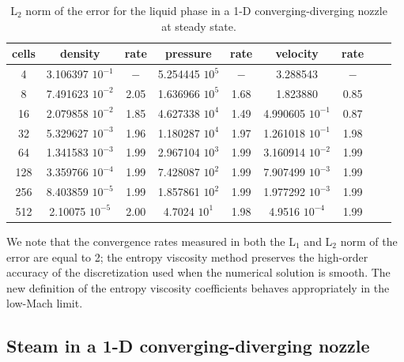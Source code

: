 \documentclass[review,10pt]{elsarticle}
\newcommand{\tcr}[1]{\textcolor{red}{#1}}
\newcommand{\tcb}[1]{\textcolor{blue}{#1}}
\begin{document}
%
%
\begin{table}[H]
\begin{center}
 \caption{\label{tbl:l2_norm_liq} L$_2$ norm of the error for the liquid phase in a 1-D converging-diverging nozzle at steady state.}
 \begin{tabular}{|c|c|c|c|c|c|c|c|c|}
 \hline
cells& density            & rate & pressure          & rate & velocity           & rate \\ \hline
4    & 3.106397 $10^{-1}$ & $-$  & 5.254445 $10^{5}$ & $-$  & 3.288543           & $-$  \\ \hline
8    & 7.491623 $10^{-2}$ & 2.05 & 1.636966 $10^{5}$ & 1.68 & 1.823880           & 0.85 \\ \hline
16   & 2.079858 $10^{-2}$ & 1.85 & 4.627338 $10^{4}$ & 1.49 & 4.990605 $10^{-1}$ & 0.87 \\ \hline
32   & 5.329627 $10^{-3}$ & 1.96 & 1.180287 $10^{4}$ & 1.97 & 1.261018 $10^{-1}$ & 1.98 \\ \hline
64   & 1.341583 $10^{-3}$ & 1.99 & 2.967104 $10^{3}$ & 1.99 & 3.160914 $10^{-2}$ & 1.99 \\ \hline
128  & 3.359766 $10^{-4}$ & 1.99 & 7.428087 $10^{2}$ & 1.99 & 7.907499 $10^{-3}$ & 1.99 \\ \hline
256  & 8.403859 $10^{-5}$ & 1.99 & 1.857861 $10^{2}$ & 1.99 & 1.977292 $10^{-3}$ & 1.99 \\ \hline
512  & 2.10075  $10^{-5}$ & 2.00 & 4.7024   $10^{1}$ & 1.98 & 4.9516   $10^{-4}$ & 1.99 \\ \hline
\end{tabular}
\end{center}
\end{table}
We note that the convergence rates measured in both the L$_1$ and L$_2$ norm of the error are equal to 2; the entropy viscosity method preserves 
the high-order accuracy of the discretization used when the numerical solution is smooth. The new definition of the entropy viscosity coefficients behaves 
appropriately in the low-Mach limit.

\subsection{Steam in a 1-D converging-diverging nozzle} \label{sec:steam_nozzle}
\end{document}
